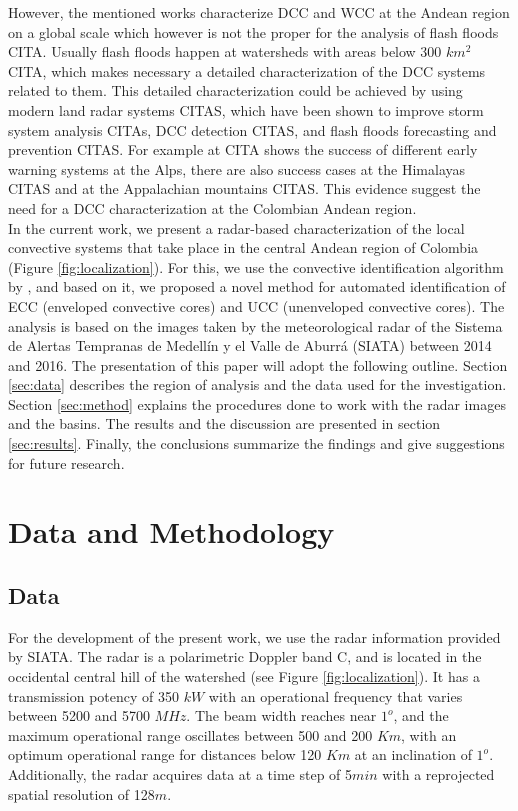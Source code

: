 \documentclass[preprint,12pt]{elsarticle}
\begin{document}
However, the mentioned works characterize DCC and WCC at the Andean region on a global scale which however is not the proper for the analysis of flash floods CITA. Usually flash floods happen at watersheds with areas below 300 $km^2$ CITA, which makes necessary a detailed characterization of the DCC systems related to them. This detailed characterization could be achieved by using modern land radar systems CITAS, which have been shown to improve storm system analysis CITAs, DCC detection CITAS, and flash floods forecasting and prevention CITAS. For example at CITA shows the success of different early warning systems at the Alps, there are also success cases at the Himalayas CITAS and at the Appalachian mountains CITAS. This evidence suggest the need for a DCC characterization at the Colombian Andean region.\\

In the current work, we present a radar-based characterization of the local convective systems that take place in the central Andean region of Colombia (Figure \ref{fig:localization}).  For this, we use the convective identification algorithm by \cite{Steiner1995}, and based on it, we proposed a novel method for automated identification of ECC (enveloped convective cores) and UCC (unenveloped convective cores). The analysis is based on the images taken by the meteorological radar of the Sistema de Alertas Tempranas de Medellín y el Valle de Aburrá (SIATA) between 2014 and 2016. The presentation of this paper will adopt the following outline. Section \ref{sec:data} describes the region of analysis and the data used for the investigation.  Section \ref{sec:method} explains the procedures done to work with the radar images and the basins.   The results and the discussion are presented in section \ref{sec:results}.  Finally, the conclusions summarize the findings and give suggestions for future research.\\

\section{Data and Methodology}
\label{data_metod}

\subsection{Data}
\label{data}

For the development of the present work, we use the radar information provided by SIATA. The radar is a polarimetric Doppler band C, and is located in the occidental central hill of the watershed (see Figure \ref{fig:localization}). It has a transmission potency of 350 $kW$ with an operational frequency that varies between 5200 and 5700 $MHz$. The beam width reaches near $1^o$, and the maximum operational range oscillates between 500 and 200 $Km$, with an optimum operational range for distances below 120 $Km$ at an inclination of $1^o$.  Additionally, the radar acquires data at a time step of 5$min$ with a reprojected spatial resolution of  128$m$.\\ 
\end{document}
